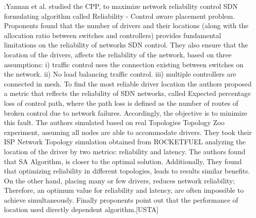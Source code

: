 \documentclass[a4paper,10pt]{article}
\begin{document}
%
%
%
%

\cite{HuWa14}:Yannan et al. studied the CPP, to maximize network reliability control SDN formulating algorithm called Reliability - Control aware placement problem. Proponents found that the number of drivers and their locations (along with the allocation ratio between switches and controllers) provides fundamental limitations on the reliability of networks SDN control. They also ensure that the location of the drivers, affects the reliability of the network, based on three assumptions: i) traffic control uses the connection existing between switches on the network. ii) No load balancing traffic control. iii) multiple controllers are connected in mesh. To find the most reliable driver location the authors proposed a metric that reflects the reliability of SDN networks, called Expected percentage loss of control path, where the path loss is defined as the number of routes of broken control due to network failures. Accordingly, the objective is to minimize this fault. The authors simulated based on real Topologies Topology Zoo experiment, assuming all nodes are able to accommodate drivers. They took their ISP Network Topology simulation obtained from ROCKETFUEL analyzing the location of the driver by two metrics: reliability and latency. The authors found that SA Algorithm, is closer to the optimal solution. Additionally, They found that optimizing reliability in different topologies, leads to results similar benefits. On the other hand, placing many or few drivers, reduces network reliability; Therefore, an optimum value for reliability and latency, are often impossible to achieve simultaneously. Finally proponents point out that the performance of location used directly dependent algorithm.[USTA]
\end{document}

